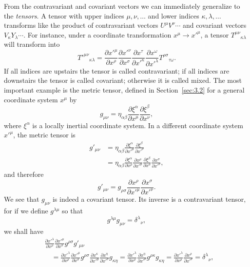 From the contravariant and covariant vectors we can immediately generalize to
the \textit{tensors}. A tensor with upper indices \(\mu,\nu,\ldots\) and
lower indices \(\kappa,\lambda,\ldots\) transforms like the product of
contravariant vectors \(U^\mu V^\nu\cdots\) and covariant vectors
\(V_\kappa Y_\lambda\cdots\). For instance, under a coordinate
transformation \(x^\mu\to x'^\mu\), a tensor
\(T^{\mu\nu}{}_{\kappa\lambda}\) will transform into
\begin{equation}
  T'^{\mu\nu}{}_{\kappa\lambda}
  =
  \frac{\partial x'^\mu}{\partial x^\rho}
  \frac{\partial x'^\nu}{\partial x^\sigma}
  \frac{\partial x^\tau}{\partial x'^\kappa}
  \frac{\partial x^\omega}{\partial x'^\lambda}
  T^{\rho\sigma}{}_{\tau\omega}.
  \tag{4.2.5}\label{eq:4.2.5}
\end{equation}
If all indices are upstairs the tensor is called contravariant; if all
indices are downstairs the tensor is called covariant; otherwise it is called
mixed. The most important example is the metric tensor, defined in
Section~\ref{sec:3.2} for a general coordinate system \(x^\mu\) by
\[
  g_{\mu\nu}
  =\eta_{\alpha\beta}
   \frac{\partial \xi^\alpha}{\partial x^\mu}
   \frac{\partial \xi^\beta}{\partial x^\nu},
\]
where \(\xi^\alpha\) is a locally inertial coordinate system. In a different
coordinate system \(x'^\mu\), the metric tensor is
\begin{align*}
  g'_{\mu\nu}
  &=
  \eta_{\alpha\beta}
  \frac{\partial \xi^\alpha}{\partial x'^\mu}
  \frac{\partial \xi^\beta}{\partial x'^\nu}
  \\
  &=
  \eta_{\alpha\beta}
  \frac{\partial \xi^\alpha}{\partial x^\rho}
  \frac{\partial x^\rho}{\partial x'^\mu}
  \frac{\partial \xi^\beta}{\partial x^\sigma}
  \frac{\partial x^\sigma}{\partial x'^\nu},
\end{align*}
and therefore
\begin{equation}
  g'_{\mu\nu}
  =
  g_{\rho\sigma}
  \frac{\partial x^\rho}{\partial x'^\mu}
  \frac{\partial x^\sigma}{\partial x'^\nu}.
  \tag{4.2.6}\label{eq:4.2.6}
\end{equation}
We see that \(g_{\mu\nu}\) is indeed a covariant tensor. Its inverse is a
contravariant tensor, for if we define \(g^{\lambda\mu}\) so that
\[
  g^{\lambda\mu}g_{\mu\nu}=\delta^\lambda{}_\nu,
\]
we shall have
\begin{align*}
  &\frac{\partial x'^\lambda}{\partial x^\rho}
   \frac{\partial x'^\mu}{\partial x^\sigma}
   g^{\rho\sigma}g'_{\mu\nu}
  \\
  &\quad =
  \frac{\partial x'^\lambda}{\partial x^\rho}
  \frac{\partial x'^\mu}{\partial x^\sigma}
  g^{\rho\sigma}
  \frac{\partial x^\kappa}{\partial x'^\mu}
  \frac{\partial x^\eta}{\partial x'^\nu}
  g_{\kappa\eta}
  =
  \frac{\partial x'^\lambda}{\partial x^\rho}
  \frac{\partial x^\eta}{\partial x'^\nu}
  g^{\rho\kappa}g_{\kappa\eta}
  =
  \frac{\partial x'^\lambda}{\partial x^\rho}
  \frac{\partial x^\rho}{\partial x'^\nu}
  =
  \delta^\lambda{}_\nu,
\end{align*}
